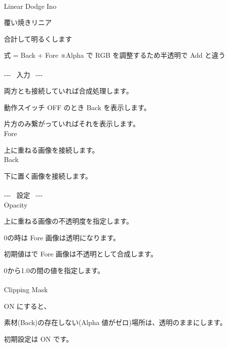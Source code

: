 \documentclass[a4paper,12pt]{article}
\begin{document}
\thispagestyle{empty}

\Large
\noindent \\
Linear Dodge Ino\medskip
\par
\normalsize
覆い焼きリニア\par
合計して明るくします\par
式 = Back + Fore ※Alpha で RGB を調整するため半透明で Add と違う\\
\\
-{-}- \ 入力 \ -{-}-\par
両方とも接続していれば合成処理します。\par
動作スイッチ OFF のとき Back を表示します。\par
片方のみ繋がっていればそれを表示します。\\
Fore\par
上に重ねる画像を接続します。\\
Back\par
下に置く画像を接続します。\\
\\
-{-}- \ 設定 \ -{-}-\\
Opacity\par
上に重ねる画像の不透明度を指定します。\par
0の時は Fore 画像は透明になります。\par
初期値は\textquotedbl で Fore 画像は不透明として合成します。\par
0から1.0の間の値を指定します。\\
\\
Clipping Mask\par
ON にすると、\par
素材(Back)の存在しない(Alpha 値がゼロ)場所は、透明のままにします。\par
初期設定は ON です。
\end{document}
